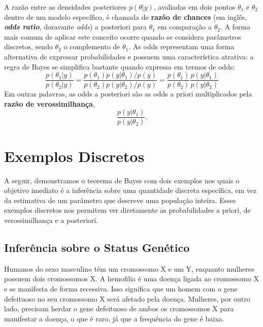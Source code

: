 A razão entre as densidades posteriores $ p(\theta|y) $, avaliadas em dois pontos $ \theta_1 $ e $ \theta_2 $ dentro de um modelo específico, é chamada de \textbf{razão de chances} (em inglês, \textbf{\textit{odds ratio}}, doravante \textit{odds}) a posteriori para $ \theta_1 $ em comparação a $ \theta_2 $. A forma mais comum de aplicar este conceito ocorre quando se considera parâmetros discretos, sendo $ \theta_2 $ o complemento de $ \theta_1 $. As odds representam uma forma alternativa de expressar probabilidades e possuem uma característica atrativa: a regra de Bayes se simplifica bastante quando expressa em termos de odds:
\begin{equation}
\dfrac{p(\theta_1|y)}{p(\theta_2|y)} = \dfrac{p(\theta_1)p(y|\theta_1)/p(y)}{p(\theta_2)p(y|\theta_2)/p(y)} = \dfrac{p(\theta_1)}{p(\theta_2)}\dfrac{p(y|\theta_1)}{p(y|\theta_2)}
\end{equation}
Em outras palavras, as odds a posteriori são as odds a priori multiplicados pela \textbf{razão de verossimilhança}, 
\begin{equation*}
 \dfrac{p(y|\theta_1)}{p(y|\theta_2)}.
\end{equation*}

\section{Exemplos Discretos}

A seguir, demonstramos o teorema de Bayes com dois exemplos nos quais o objetivo imediato é a inferência sobre uma quantidade discreta específica, em vez da estimativa de um parâmetro que descreve uma população inteira. Esses exemplos discretos nos permitem ver diretamente as probabilidades a priori, de verossimilhança e a posteriori.

\subsection{Inferência sobre o Status Genético}

Humanos do sexo masculino têm um cromossomo X e um Y, enquanto mulheres possuem dois cromossomos X. A hemofilia é uma doença ligada ao cromossomo X e se manifesta de forma recessiva. Isso significa que um homem com o gene defeituoso no seu cromossomo X será afetado pela doença. Mulheres, por outro lado, precisam herdar o gene defeituoso de ambos os cromossomos X para manifestar a doença, o que é raro, já que a frequência do gene é baixa.

